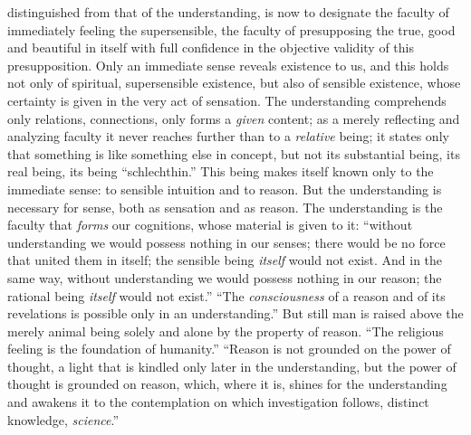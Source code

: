 distinguished from that of the understanding, is now to designate the
faculty of immediately feeling the supersensible, the faculty of
presupposing the true, good and beautiful in itself with full
confidence in the objective validity of this presupposition. Only an
immediate sense reveals existence to us, and this holds not only of
spiritual, supersensible existence, but also of sensible existence,
whose certainty is given in the very act of sensation. The
understanding comprehends only relations, connections, only forms a
\emph{given} content; as a merely reflecting and analyzing faculty it
never reaches further than to a \emph{relative} being; it states only
that something is like something else in concept, but not its
substantial being, its real being, its being ``schlechthin.'' This
being makes itself known only to the immediate sense: to sensible
intuition and to reason. But the understanding is necessary for sense,
both as sensation and as reason. The understanding is the faculty that
\emph{forms} our cognitions, whose material is given to it: ``without
understanding we would possess nothing in our senses; there would be no
force that united them in itself; the sensible being \emph{itself}
would not exist. And in the same way, without understanding
we would possess nothing in our reason; the rational being
\emph{itself} would not exist.'' ``The \emph{consciousness} of a reason
and of its revelations is possible only in an understanding.'' But
still man is raised above the merely animal being solely and alone by
the property of reason. ``The religious feeling is the foundation of
humanity.'' ``Reason is not grounded on the power of thought, a light
that is kindled only later in the understanding, but the power of
thought is grounded on reason, which, where it is, shines for the
understanding and awakens it to the contemplation on which
investigation follows, distinct knowledge, \emph{science}.''

